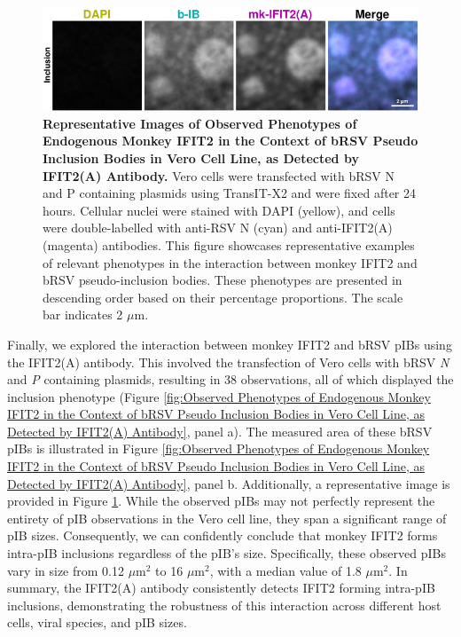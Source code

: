 \begin{figure}
    \centering
    \includegraphics[width=1\linewidth]{09. Chapter 4/Figs/01. pIB/03. IFIT2/02. IFIT2A/09. i2a-vero-bnbp.pdf} 
    \caption[Representative Images of Observed Phenotypes of Endogenous Monkey IFIT2 in the Context of bRSV Pseudo Inclusion Bodies in Vero Cell Line, as Detected by IFIT2(A) Antibody.]{\textbf{Representative Images of Observed Phenotypes of Endogenous Monkey IFIT2 in the Context of bRSV Pseudo Inclusion Bodies in Vero Cell Line, as Detected by IFIT2(A) Antibody.} Vero cells were transfected with bRSV N and P containing plasmids using TransIT-X2 and were fixed after 24 hours. Cellular nuclei were stained with DAPI (yellow), and cells were double-labelled with anti-RSV N (cyan) and anti-IFIT2(A) (magenta) antibodies. This figure showcases representative examples of relevant phenotypes in the interaction between monkey IFIT2 and bRSV pseudo-inclusion bodies. These phenotypes are presented in descending order based on their percentage proportions. The scale bar indicates 2 \(\mu \mbox{m}\).}
    \label{fig:Representative Images of Observed Phenotypes of Endogenous Monkey IFIT2 in the Context of bRSV Pseudo Inclusion Bodies in Vero Cell Line, as Detected by IFIT2(A) Antibody}
\end{figure}

Finally, we explored the interaction between monkey IFIT2 and bRSV pIBs using the IFIT2(A) antibody. This involved the transfection of Vero cells with bRSV \textit{N} and \textit{P} containing plasmids, resulting in 38 observations, all of which displayed the inclusion phenotype (Figure \ref{fig:Observed Phenotypes of Endogenous Monkey IFIT2 in the Context of bRSV Pseudo Inclusion Bodies in Vero Cell Line, as Detected by IFIT2(A) Antibody}, panel a). The measured area of these bRSV pIBs is illustrated in Figure \ref{fig:Observed Phenotypes of Endogenous Monkey IFIT2 in the Context of bRSV Pseudo Inclusion Bodies in Vero Cell Line, as Detected by IFIT2(A) Antibody}, panel b. Additionally, a representative image is provided in Figure \ref{fig:Representative Images of Observed Phenotypes of Endogenous Monkey IFIT2 in the Context of bRSV Pseudo Inclusion Bodies in Vero Cell Line, as Detected by IFIT2(A) Antibody}. While the observed pIBs may not perfectly represent the entirety of pIB observations in the Vero cell line, they span a significant range of pIB sizes. Consequently, we can confidently conclude that monkey IFIT2 forms intra-pIB inclusions regardless of the pIB's size. Specifically, these observed pIBs vary in size from 0.12 \(\mu \mbox{m}^2\) to 16 \(\mu \mbox{m}^2\), with a median value of 1.8 \(\mu \mbox{m}^2\). In summary, the IFIT2(A) antibody consistently detects IFIT2 forming intra-pIB inclusions, demonstrating the robustness of this interaction across different host cells, viral species, and pIB sizes.

